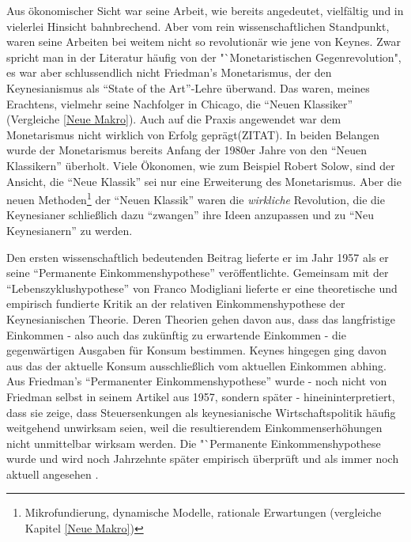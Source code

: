 Aus ökonomischer Sicht war seine Arbeit, wie bereits angedeutet, vielfältig und in vielerlei Hinsicht bahnbrechend. Aber vom rein wissenschaftlichen Standpunkt, waren seine Arbeiten bei weitem nicht so revolutionär wie jene von Keynes. Zwar spricht man in der Literatur häufig von der "`Monetaristischen Gegenrevolution", es war aber schlussendlich nicht Friedman's Monetarismus, der den Keynesianismus als "`State of the Art"'-Lehre überwand. Das waren, meines Erachtens, vielmehr seine Nachfolger in Chicago, die "`Neuen Klassiker"' (Vergleiche \ref{Neue Makro}). Auch auf die Praxis angewendet war dem Monetarismus nicht wirklich von Erfolg geprägt(ZITAT). In beiden Belangen wurde der Monetarismus bereits Anfang der 1980er Jahre von den "`Neuen Klassikern"' überholt. Viele Ökonomen, wie zum Beispiel Robert Solow, sind der Ansicht, die "`Neue Klassik"' sei nur eine Erweiterung des Monetarismus\parencite[S.342]{Warsh}. Aber die neuen Methoden\footnote{Mikrofundierung, dynamische Modelle, rationale Erwartungen (vergleiche Kapitel \ref{Neue Makro})} der "`Neuen Klassik"' waren die \textit{wirkliche} Revolution, die die Keynesianer schließlich dazu "`zwangen"' ihre Ideen anzupassen und zu "`Neu Keynesianern"' zu werden.

Den ersten wissenschaftlich bedeutenden Beitrag lieferte er im Jahr 1957 \parencite{Friedman1957} als er seine "`Permanente Einkommenshypothese"' veröffentlichte. Gemeinsam mit der "`Lebenszyklushypothese"' \parencite{Modigliani1954} von Franco Modigliani lieferte er eine theoretische und empirisch fundierte Kritik an der relativen Einkommenshypothese der Keynesianischen Theorie. Deren Theorien gehen davon aus, dass das langfristige Einkommen - also auch das zukünftig zu erwartende Einkommen - die gegenwärtigen Ausgaben für Konsum bestimmen. Keynes hingegen ging davon aus das der aktuelle Konsum ausschließlich vom aktuellen Einkommen abhing. Aus Friedman's "`Permanenter Einkommenshypothese"' wurde - noch nicht von Friedman selbst in seinem Artikel aus 1957, sondern später - hineininterpretiert, dass sie zeige, dass Steuersenkungen als keynesianische Wirtschaftspolitik häufig weitgehend unwirksam seien, weil die resultierendem Einkommenserhöhungen nicht unmittelbar wirksam werden. Die "`Permanente Einkommenshypothese wurde und wird noch Jahrzehnte später empirisch überprüft und als immer noch aktuell angesehen \parencite{Bernanke1984, Mankiw1985}.  

